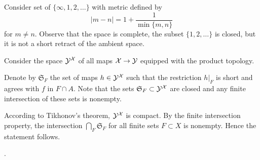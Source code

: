 Consider set of $\{\infty,1,2,\dots\}$ with metric defined by 
\[|m-n|=1+\frac1{\min\{m,n\}}\]
for $m\ne n$.
Observe that the space is complete, the subset $\{1,2,\dots\}$ is closed, but it is not a short retract of the ambient space.

 Consider the space $\mathcal{Y}^{\mathcal{X}}$ of all maps $\spc{X}\z\to \spc{Y}$ equipped with the product topology.

Denote by $\mathfrak{S}_F$ the set of maps $h\in \mathcal{Y}^{\mathcal{X}}$ such that the restriction $h|_F$  is short and agrees with $f$ in $F\cap A$.
Note that the sets $\mathfrak{S}_F\subset \mathcal{Y}^{\mathcal{X}}$ are closed and any finite intersection of these sets is nonempty.

According to Tikhonov's theorem, $\mathcal{Y}^{\mathcal{X}}$ is compact.
By the finite intersection property, the intersection $\bigcap_F\mathfrak{S}_F$ for all finite sets $F\subset X$ is nonempty.
Hence the statement follows.

 \cite{petrunin-stadler}.
